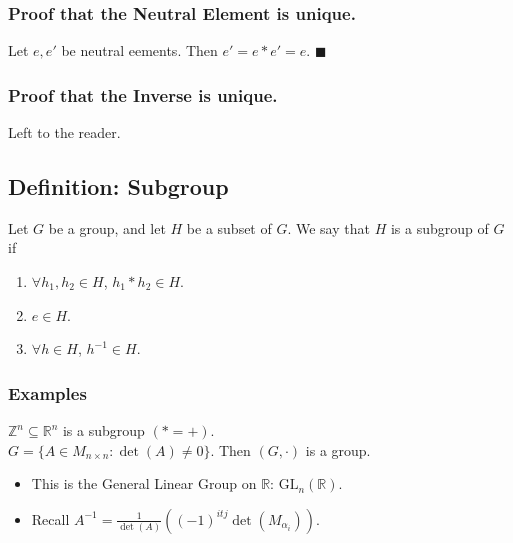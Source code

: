 \documentclass[11pt]{article}
\newcommand{\0}{\emptyset}
\newcommand{\Z}{\mathbb{Z}}
\newcommand{\R}{\mathbb{R}}
\begin{document}
\subsubsection*{Proof that the Neutral Element is unique.}
\label{sec:org76a1cb6}
Let \(e,e'\) be neutral eements. Then \(e'=e*e'=e\). \(\blacksquare\)\\[0pt]
\subsubsection*{Proof that the Inverse is unique.}
\label{sec:org974a29b}
Left to the reader.\\[0pt]
\subsection*{Definition: Subgroup}
\label{sec:orgfea1e18}
Let \(G\) be a group, and let \(H\) be a subset of \(G\). We say that \(H\) is a subgroup of \(G\) if\\[0pt]
\begin{enumerate}
\item \(\forall h_{1},h_{2}\in H\), \(h_{1}*h_{2}\in H\).\\[0pt]
\item \(e\in H\).\\[0pt]
\item \(\forall h\in H\), \(h^{-1}\in H\).\\[0pt]
\end{enumerate}
\subsubsection*{Examples}
\label{sec:orga852ac6}
\(\Z^{n}\subseteq \R^{n}\) is a subgroup \((*=+)\).\\[0pt]
\(G=\{A\in M_{n\times n}:\det(A)\neq 0\}\). Then \((G,\cdot)\) is a group.\\[0pt]
\begin{itemize}
\item This is the General Linear Group on \(\R\): \(\text{GL}_{n}(\R)\).\\[0pt]
\item Recall \(A^{-1}=\frac{1}{\det(A)}\left( (-1)^{itj}\det(M_{\alpha_{i}}) \right)\).\\[0pt]
\end{itemize}
\end{document}
